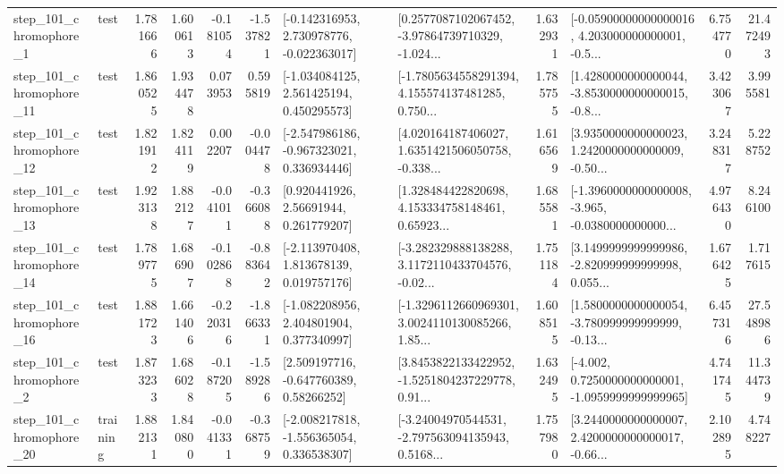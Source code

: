 \begin{tabular}{llrrrrllrlrr}
   step\_101\_chromophore\_1 &      test &      1.781666 &    1.600613 &     -0.181054 & -1.537821 &   [-0.142316953, 2.730978776, -0.022363017] &  [0.2577087102067452, -3.97864739710329, -1.024... &       1.632931 &  [-0.05900000000000016, 4.203000000000001, -0.5... &            6.754770 &         21.472493 \\
  step\_101\_chromophore\_11 &      test &      1.860525 &    1.934478 &      0.073953 &  0.595819 &    [-1.034084125, 2.561425194, 0.450295573] &  [-1.7805634558291394, 4.155574137481285, 0.750... &       1.785755 &  [1.4280000000000044, -3.8530000000000015, -0.8... &            3.423067 &          3.995581 \\
  step\_101\_chromophore\_12 &      test &      1.821912 &    1.824119 &      0.002207 & -0.004478 &   [-2.547986186, -0.967323021, 0.336934446] &  [4.020164187406027, 1.6351421506050758, -0.338... &       1.616569 &  [3.9350000000000023, 1.2420000000000009, -0.50... &            3.248317 &          5.228752 \\
  step\_101\_chromophore\_13 &      test &      1.923138 &    1.882127 &     -0.041011 & -0.366088 &      [0.920441926, 2.56691944, 0.261779207] &  [1.328484422820698, 4.153334758148461, 0.65923... &       1.685581 &  [-1.3960000000000008, -3.965, -0.0380000000000... &            4.976430 &          8.246100 \\
  step\_101\_chromophore\_14 &      test &      1.789775 &    1.686907 &     -0.102868 & -0.883642 &    [-2.113970408, 1.813678139, 0.019757176] &  [-3.282329888138288, 3.1172110433704576, -0.02... &       1.751184 &  [3.1499999999999986, -2.820999999999998, 0.055... &            1.676425 &          1.717615 \\
  step\_101\_chromophore\_16 &      test &      1.881723 &    1.661406 &     -0.220316 & -1.866331 &    [-1.082208956, 2.404801904, 0.377340997] &  [-1.3296112660969301, 3.0024110130085266, 1.85... &       1.608515 &  [1.5800000000000054, -3.780999999999999, -0.13... &            6.457316 &         27.548986 \\
   step\_101\_chromophore\_2 &      test &      1.873233 &    1.686028 &     -0.187205 & -1.589286 &     [2.509197716, -0.647760389, 0.58266252] &  [3.8453822133422952, -1.5251804237229778, 0.91... &       1.632495 &  [-4.002, 0.7250000000000001, -1.0959999999999965] &            4.741745 &         11.344739 \\
  step\_101\_chromophore\_20 &  training &      1.882131 &    1.840800 &     -0.041331 & -0.368759 &   [-2.008217818, -1.556365054, 0.336538307] &  [-3.24004970544531, -2.797563094135943, 0.5168... &       1.757980 &  [3.2440000000000007, 2.4200000000000017, -0.66... &            2.102895 &          4.748227 \\

\end{tabular}
